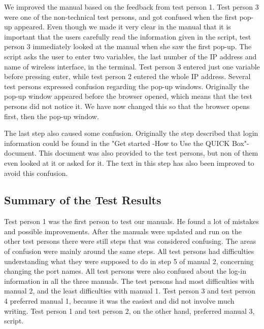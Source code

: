 We improved the manual based on the feedback from test person 1. Test person 3 were one of the non-technical test persons, and got confused when the first pop-up appeared. Even though we made it very clear in the manual that it is important that the users carefully read the information given in the script, test person 3 immediately looked at the manual when she saw the first pop-up. The script asks the user to enter two variables, the last number of the IP address and name of wireless interface, in the terminal. Test person 3 entered just one variable before pressing enter, while test person 2 entered the whole IP address. 
Several test persons expressed confusion regarding the pop-up windows. Originally the pop-up window appeared before the browser opened, which means that the test persons did not notice it. We have now changed this so that the browser opens first, then the pop-up window. 

The last step also caused some confusion. Originally the step described that login information could be found in the "Get started -How to Use the QUICK Box"-document. This document was also provided to the test persons, but non of them even looked at it or asked for it. The text in this step has also been improved to avoid this confusion.

\subsection{Summary of the Test Results}
Test person 1 was the first person to test our manuals. He found a lot of mistakes and possible improvements. After the manuals were updated and run on the other test persons there were still steps that was considered confusing. The areas of confusion were mainly around the same steps. All test persons had difficulties understanding what they were supposed to do in step 5 of manual 2, concerning changing the port names. All test persons were also confused about the log-in information in all the three manuals. The test persons had most difficulties with manual 2, and the least difficulties with manual 1. Test person 3 and test person 4 preferred manual 1, because it was the easiest and did not involve much writing. Test person 1 and test person 2, on the other hand, preferred manual 3, script.  
